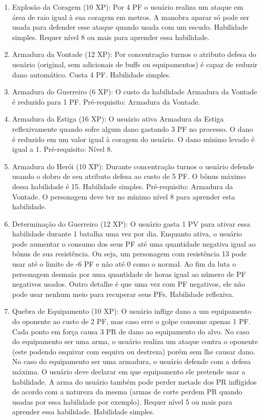 \begin{enumerate}
	\item Explosão da Coragem (10 XP): Por 4 PF o usuário realiza um ataque em área de raio igual à sua coragem em metros. A manobra aparar só pode ser usada para defender esse ataque quando usada com um escudo. Habilidade simples. Requer nível 8 ou mais para aprender essa habilidade.

	\item Armadura da Vontade (12 XP): Por concentração turnos o atributo defesa do usuário (original, sem adicionais de buffs ou equipamentos) é capaz de reduzir dano automático. Custa 4 PF. Habilidade simples.

	\item Armadura do Guerreiro (6 XP): O custo da habilidade Armadura da Vontade é reduzido para 1 PF. Pré-requisito: Armadura da Vontade. 

	\item Armadura da Estiga (16 XP): O usuário ativa Armadura da Estiga reflexivamente quando sofre algum dano gastando 3 PF no processo. O dano é reduzido em um valor igual à coragem do usuário. O dano mínimo levado é igual a 1. Pré-requisito: Nível 8. 

	\item Armadura do Herói (10 XP): Durante concentração turnos o usuário defende usando o dobro de seu atributo defesa ao custo de 5 PF. O bônus máximo dessa habilidade é 15. Habilidade simples. Pré-requisito: Armadura da Vontade. O personagem deve ter no mínimo nível 8 para aprender esta habilidade.

	\item Determinação do Guerreiro (12 XP): O usuário gasta 1 PV para ativar essa habilidade durante 1 batalha uma vez por dia. Enquanto ativa, o usuário pode aumentar o consumo dos seus PF até uma quantidade negativa igual ao bônus de sua resistência. Ou seja, um personagem com resistência 13 pode usar até o limite de -6 PF e não até 0 como o normal. Ao fim da luta o personagem desmaia por uma quantidade de horas igual ao número de PF negativos usados. Outro detalhe é que uma vez com PF negativos, ele não pode usar nenhum meio para recuperar seus PFs. Habilidade reflexiva.

	\item Quebra de Equipamento (10 XP): O usuário inflige dano a um equipamento do oponente ao custo de 2 PF, mas caso erre o golpe consome apenas 1 PF. Cada ponto em força causa 3 PR de dano ao equipamento do alvo. No caso do equipamento ser uma arma, o usuário realiza um ataque contra o oponente (este podendo esquivar com esquiva ou destreza) porém sem lhe causar dano. No caso do equipamento ser uma armadura, o usuário defende com a defesa máxima. O usuário deve declarar em que equipamento ele pretende usar a habilidade. A arma do usuário também pode perder metade dos PR infligidos de acordo com a natureza da mesma (armas de corte perdem PR quando usadas por essa habilidade por exemplo). Requer nível 5 ou mais para aprender essa habilidade. Habilidade simples.


\end{enumerate}
